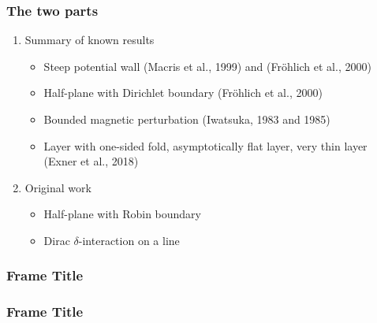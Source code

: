\documentclass{beamer}
\begin{document}
\begin{frame}
    \frametitle{The two parts}

    \begin{enumerate}
        \item Summary of known results
        \\[5pt]
        \begin{itemize}
            \item Steep potential wall (Macris et al., 1999) and (Fröhlich et al., 2000)
            \\[5pt]
            \item Half-plane with Dirichlet boundary (Fröhlich et al., 2000)
            \\[5pt]
            \item Bounded magnetic perturbation (Iwatsuka, 1983 and 1985)
            \\[5pt]
            \item Layer with one-sided fold, asymptotically flat layer, very thin layer (Exner et al., 2018)
            \\[15pt]
        \end{itemize}
        \pause
        \item Original work
        \\[5pt]
        \begin{itemize}
            \item Half-plane with Robin boundary
            \\[5pt]
            \item Dirac $\delta$-interaction on a line
        \end{itemize}
    \end{enumerate}
\end{frame}

\begin{frame}
    \frametitle{Frame Title}
    \centering
\end{frame}

\begin{frame}
    \frametitle{Frame Title}
    \centering
\end{frame}
\end{document}
